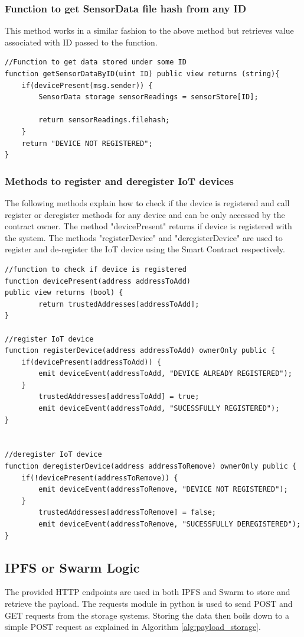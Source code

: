 \documentclass[11pt,openright]{report}
\begin{document}
\subsubsection{Function to get SensorData file hash from any ID}
This method works in a similar fashion to the above method but retrieves value associated with ID passed to the function.

\begin{lstlisting}
//Function to get data stored under some ID
function getSensorDataByID(uint ID) public view returns (string){
    if(devicePresent(msg.sender)) {
        SensorData storage sensorReadings = sensorStore[ID];

        return sensorReadings.filehash;
    }
    return "DEVICE NOT REGISTERED";
}
\end{lstlisting}

\subsubsection{Methods to register and deregister IoT devices}
The following methods explain how to check if the device is registered and call register or deregister methods for any device and can be only accessed by the contract owner. 
The method "devicePresent" returns if device is registered with the system.
The methods "registerDevice" and "deregisterDevice" are used to register and de-register the IoT device using the Smart Contract respectively.
\begin{lstlisting}
//function to check if device is registered
function devicePresent(address addressToAdd) 
public view returns (bool) {
        return trustedAddresses[addressToAdd];
}

//register IoT device
function registerDevice(address addressToAdd) ownerOnly public {
    if(devicePresent(addressToAdd)) {
        emit deviceEvent(addressToAdd, "DEVICE ALREADY REGISTERED");
    }
        trustedAddresses[addressToAdd] = true;
        emit deviceEvent(addressToAdd, "SUCESSFULLY REGISTERED");
}


//deregister IoT device
function deregisterDevice(address addressToRemove) ownerOnly public {
    if(!devicePresent(addressToRemove)) {
        emit deviceEvent(addressToRemove, "DEVICE NOT REGISTERED");
    }
        trustedAddresses[addressToRemove] = false;
        emit deviceEvent(addressToRemove, "SUCESSFULLY DEREGISTERED");
}
\end{lstlisting}
\newpage

\subsection{IPFS or Swarm Logic}
The provided HTTP endpoints are used in both IPFS and Swarm to store and retrieve the payload. The requests module in python is used to send POST and GET requests from the storage systems. Storing the data then boils down to a simple POST request as explained in Algorithm \ref{alg:payload_storage}.
\end{document}
